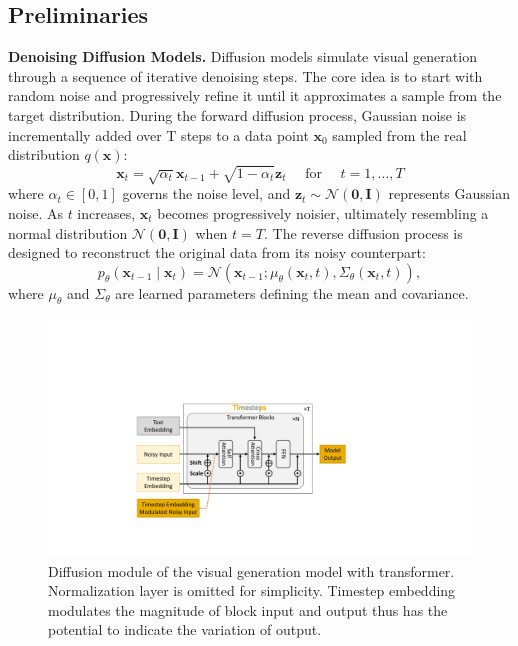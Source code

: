 \subsection{Preliminaries}
\textbf{Denoising Diffusion Models.} Diffusion models simulate visual generation through a sequence of iterative denoising steps. The core idea is to start with random noise and progressively refine it until it approximates a sample from the target distribution. During the forward diffusion process, Gaussian noise is incrementally added over T steps to a data point $\mathbf{x}_{0}$ sampled from the real distribution $q(\mathbf{x})$:
\begin{equation}
\mathbf{x}_{t}=\sqrt{\alpha_{t}} \mathbf{x}_{t-1}+\sqrt{1-\alpha_{t}} \mathbf{z}_{t} \quad \text { for } \quad t=1, \ldots, T
\end{equation}
where $\alpha_t \in [0,1]$ governs the noise level, and $\mathbf{z}_t \sim \mathcal{N}(\mathbf{0}, \mathbf{I})$ represents Gaussian noise. As $t$ increases, $\mathbf{x}_t$ becomes progressively noisier, ultimately resembling a normal distribution $\mathcal{N}(\mathbf{0}, \mathbf{I})$ when $t=T$. The reverse diffusion process is designed to reconstruct the original data from its noisy counterpart:
\begin{equation}
p_\theta(\mathbf{x}_{t-1} \mid \mathbf{x}_t) = \mathcal{N}(\mathbf{x}_{t-1}; \mu_\theta(\mathbf{x}_t, t), \Sigma_\theta(\mathbf{x}_t, t)),
\end{equation}
where $\mu_\theta$ and $\Sigma_\theta$ are learned parameters defining the mean and covariance.

\begin{figure}
  \centering
    \includegraphics[width=1.0\linewidth]{figs/block.pdf}
  \caption{Diffusion module of the visual generation model with transformer. Normalization layer is omitted for simplicity. Timestep embedding modulates the magnitude of block input and output thus has the potential to indicate the variation of output.}
  \label{fig:block}
\end{figure}




